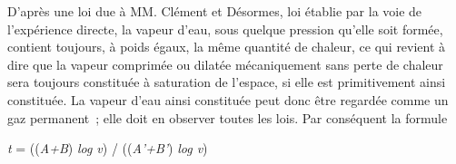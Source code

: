 \documentclass[french,twoside]{book} %
\begin{document}
D’après une loi due à MM. Clément et Désormes, loi établie par la voie de l’expérience directe, la vapeur d’eau, sous quelque pression qu’elle soit formée, contient toujours, à poids égaux, la même quantité de chaleur, ce qui revient à dire que la vapeur comprimée ou dilatée mécaniquement sans perte de chaleur sera toujours constituée à saturation de l’espace, si elle est primitivement ainsi constituée. La vapeur d’eau ainsi constituée peut donc être regardée comme un gaz permanent ; elle doit en observer toutes les lois. Par conséquent la formule\par

\begin{center}
\noindent \emph{t} = ((\emph{A+B}) \emph{log v}) / ((\emph{A’+B’}) \emph{log v})\par
\end{center}
\end{document}
